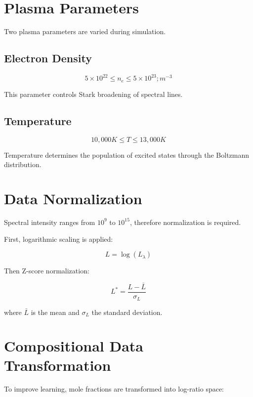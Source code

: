 \documentclass[12pt]{article}
\begin{document}
\section{Plasma Parameters}
Two plasma parameters are varied during simulation.

\subsection{Electron Density}

\begin{equation}
5\times10^{22} \leq n_e \leq 5\times10^{23} ; m^{-3}
\end{equation}

This parameter controls Stark broadening of spectral lines.

\subsection{Temperature}

\begin{equation}
10,000K \leq T \leq 13,000K
\end{equation}

Temperature determines the population of excited states through the Boltzmann distribution.

\section{Data Normalization}
Spectral intensity ranges from $10^9$ to $10^{15}$, therefore normalization is required.

First, logarithmic scaling is applied:

\begin{equation}
L = \log(L_{\lambda})
\end{equation}

Then Z-score normalization:

\begin{equation}
L^* = \frac{L - \bar{L}}{\sigma_L}
\end{equation}

where $\bar{L}$ is the mean and $\sigma_L$ the standard deviation.

\section{Compositional Data Transformation}
To improve learning, mole fractions are transformed into log-ratio space:
\end{document}

